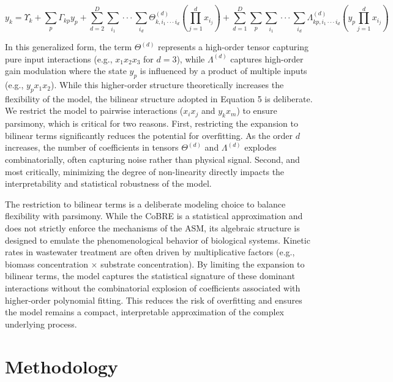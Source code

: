\documentclass{article}
\begin{document}
\begin{equation}
y_{k} = \Upsilon_{k} + \sum_{p} \Gamma_{kp} y_{p} + \sum_{d=2}^{D} \sum_{i_{1}} \cdot \cdot \cdot \sum_{i_{d}} \Theta^{(d)}_{k, i_{1} \cdot \cdot \cdot i_{d}} ( \prod_{j=1}^{d} x_{i_{j}} ) + \sum_{d=1}^{D} \sum_{p} \sum_{i_{1}} \cdot \cdot \cdot \sum_{i_{d}} \Lambda^{(d)}_{kp, i_{1} \cdot \cdot \cdot i_{d}} ( y_{p} \prod_{j=1}^{d} x_{i_{j}} )
\end{equation}

In this generalized form, the term $\Theta^{(d)}$ represents a high-order tensor capturing pure input interactions (e.g., $x_{1} x_{2} x_{3}$ for $d=3$), while $\Lambda^{(d)}$ captures high-order gain modulation where the state $y_{p}$ is influenced by a product of multiple inputs (e.g., $y_{p} x_{1} x_{2}$). While this higher-order structure theoretically increases the flexibility of the model, the bilinear structure adopted in Equation 5 is deliberate. We restrict the model to pairwise interactions ($x_{i} x_{j}$ and $y_{k} x_{m}$) to ensure parsimony, which is critical for two reasons. First, restricting the expansion to bilinear terms significantly reduces the potential for overfitting. As the order $d$ increases, the number of coefficients in tensors $\Theta^{(d)}$ and $\Lambda^{(d)}$ explodes combinatorially, often capturing noise rather than physical signal. Second, and most critically, minimizing the degree of non-linearity directly impacts the interpretability and statistical robustness of the model.

The restriction to bilinear terms is a deliberate modeling choice to balance flexibility with parsimony. While the CoBRE is a statistical approximation and does not strictly enforce the mechanisms of the ASM, its algebraic structure is designed to emulate the phenomenological behavior of biological systems. Kinetic rates in wastewater treatment are often driven by multiplicative factors (e.g., biomass concentration $\times$ substrate concentration). By limiting the expansion to bilinear terms, the model captures the statistical signature of these dominant interactions without the combinatorial explosion of coefficients associated with higher-order polynomial fitting. This reduces the risk of overfitting and ensures the model remains a compact, interpretable approximation of the complex underlying process.

\section{Methodology}
\end{document}
